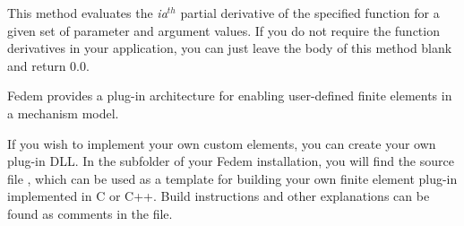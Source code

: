This method evaluates the {\sl ia}$^{th}$ partial derivative of the specified
function for a given set of parameter and argument values.
If you do not require the function derivatives in your application,
you can just leave the body of this method blank and return 0.0.




Fedem provides a plug-in architecture for enabling user-defined finite elements
in a mechanism model.

If you wish to implement your own custom elements, you can create your own
plug-in DLL. In the  subfolder of your Fedem installation,
you will find the source file , which can be used as
a template for building your own finite element plug-in implemented in C or C++.
Build instructions and other explanations can be found as comments in the file.

